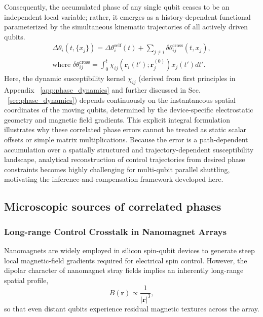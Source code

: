 \documentclass[a4paper,twocolumn,11pt]{quantumarticle}
\begin{document}
Consequently, the accumulated phase of any single qubit ceases to be an independent local variable; rather, it emerges as a history-dependent functional parameterized by the simultaneous kinematic trajectories of all actively driven qubits.
\begin{multline}
    \Delta\theta_i(t, \{x_j\}) = \Delta\theta_i^{\text{self}}(t) + \sum_{j \neq i} \delta\theta_{ij}^{\text{cross}}(t, x_j), \\
    \text{where } \delta\theta_{ij}^{\text{cross}} = \int_0^t \chi_{ij}(\mathbf{r}_i(t'); \mathbf{r}_j^{(0)}) x_j(t') dt'.
    \label{eq:phase_functional}
\end{multline}
Here, the dynamic susceptibility kernel $\chi_{ij}$ (derived from first principles in Appendix ~\ref{app:phase_dynamics} and further discussed in Sec. ~\ref{sec:phase_dynamics}) depends continuously on the instantaneous spatial coordinates of the moving qubits, determined by the device-specific electrostatic geometry and magnetic field gradients. This explicit integral formulation illustrates why these correlated phase errors cannot be treated as static scalar offsets or simple matrix multiplications. Because the error is a path-dependent accumulation over a spatially structured and trajectory-dependent susceptibility landscape, analytical reconstruction of control trajectories from desired phase constraints becomes highly challenging for multi-qubit parallel shuttling, motivating the inference-and-compensation framework developed here.

\subsection{Microscopic sources of correlated phases}
\label{sec:micro_source}

\subsubsection{Long-range Control Crosstalk in Nanomagnet Arrays}

Nanomagnets are widely employed in silicon spin-qubit devices to generate steep local magnetic-field gradients required for electrical spin control. However, the dipolar character of nanomagnet stray fields implies an inherently long-range spatial profile,
\begin{equation}
    B(\mathbf{r}) \propto \frac{1}{|\mathbf{r}|^{3}},
\end{equation}
so that even distant qubits experience residual magnetic textures across the array.
\end{document}
